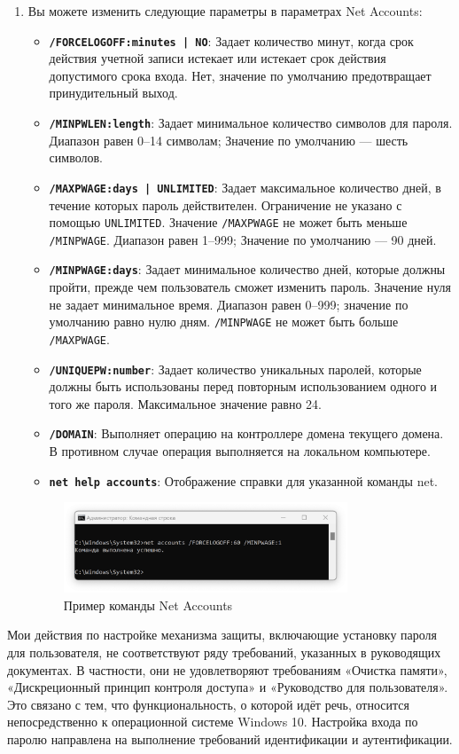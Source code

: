 \documentclass[a4paper, 14pt]{report}
\begin{document}
\begin{enumerate}
    \item Вы можете изменить следующие параметры в параметрах Net Accounts:
          \begin{itemize}
              \item \textbf{\texttt{/FORCELOGOFF:{minutes | NO}}}: Задает количество минут, когда срок действия учетной записи истекает или истекает срок действия допустимого срока входа. Нет, значение по умолчанию предотвращает принудительный выход.
              \item \textbf{\texttt{/MINPWLEN:length}}: Задает минимальное количество символов для пароля. Диапазон равен 0–14 символам; Значение по умолчанию — шесть символов.
              \item \textbf{\texttt{/MAXPWAGE:{days | UNLIMITED}}}: Задает максимальное количество дней, в течение которых пароль действителен. Ограничение не указано с помощью \texttt{UNLIMITED}. Значение \texttt{/MAXPWAGE} не может быть меньше \texttt{/MINPWAGE}. Диапазон равен 1–999; Значение по умолчанию — 90 дней.
              \item \textbf{\texttt{/MINPWAGE:days}}: Задает минимальное количество дней, которые должны пройти, прежде чем пользователь сможет изменить пароль. Значение нуля не задает минимальное время. Диапазон равен 0–999; значение по умолчанию равно нулю дням. \texttt{/MINPWAGE} не может быть больше \texttt{/MAXPWAGE}.
              \item \textbf{\texttt{/UNIQUEPW:number}}: Задает количество уникальных паролей, которые должны быть использованы перед повторным использованием одного и того же пароля. Максимальное значение равно 24.
              \item \textbf{\texttt{/DOMAIN}}: Выполняет операцию на контроллере домена текущего домена. В противном случае операция выполняется на локальном компьютере.
              \item \textbf{\texttt{net help accounts}}: Отображение справки для указанной команды net.
          \end{itemize}
          \begin{figure}[H]
              \centering
              \includegraphics[width=0.8\textwidth]{../images/net_accounts_example.png}
              \caption{Пример команды Net Accounts}
          \end{figure}
\end{enumerate}
Мои действия по настройке механизма защиты, включающие установку пароля для пользователя, не соответствуют ряду требований, указанных в руководящих документах. В частности, они не удовлетворяют требованиям «Очистка памяти», «Дискреционный принцип контроля доступа» и «Руководство для пользователя». Это связано с тем, что функциональность, о которой идёт речь, относится непосредственно к операционной системе Windows 10. Настройка входа по паролю направлена на выполнение требований идентификации и аутентификации.
\end{document}
